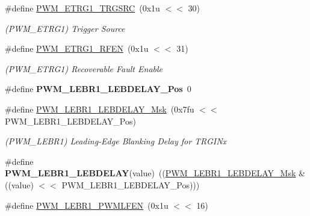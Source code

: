 \begin{DoxyCompactItemize}
\#define \mbox{\hyperlink{group__SAME70__PWM_ga616ec21bb9207fdb750346ff7c510f20}{P\+W\+M\+\_\+\+E\+T\+R\+G1\+\_\+\+T\+R\+G\+S\+RC}}~(0x1u $<$$<$ 30)
\begin{DoxyCompactList}\small\item\em (P\+W\+M\+\_\+\+E\+T\+R\+G1) Trigger Source \end{DoxyCompactList}\item 
\mbox{\label{group__SAME70__PWM_gaf62f0bc7d9db8450ab1c1ecde517d9a2}} 
\#define \mbox{\hyperlink{group__SAME70__PWM_gaf62f0bc7d9db8450ab1c1ecde517d9a2}{P\+W\+M\+\_\+\+E\+T\+R\+G1\+\_\+\+R\+F\+EN}}~(0x1u $<$$<$ 31)
\begin{DoxyCompactList}\small\item\em (P\+W\+M\+\_\+\+E\+T\+R\+G1) Recoverable Fault Enable \end{DoxyCompactList}\item 
\mbox{\label{group__SAME70__PWM_ga5973634d62b8e525c44969baf1841f96}} 
\#define {\bfseries P\+W\+M\+\_\+\+L\+E\+B\+R1\+\_\+\+L\+E\+B\+D\+E\+L\+A\+Y\+\_\+\+Pos}~0
\item 
\mbox{\label{group__SAME70__PWM_ga80e118631de809b0488bbfbcc5c1ade2}} 
\#define \mbox{\hyperlink{group__SAME70__PWM_ga80e118631de809b0488bbfbcc5c1ade2}{P\+W\+M\+\_\+\+L\+E\+B\+R1\+\_\+\+L\+E\+B\+D\+E\+L\+A\+Y\+\_\+\+Msk}}~(0x7fu $<$$<$ P\+W\+M\+\_\+\+L\+E\+B\+R1\+\_\+\+L\+E\+B\+D\+E\+L\+A\+Y\+\_\+\+Pos)
\begin{DoxyCompactList}\small\item\em (P\+W\+M\+\_\+\+L\+E\+B\+R1) Leading-\/\+Edge Blanking Delay for T\+R\+G\+I\+Nx \end{DoxyCompactList}\item 
\mbox{\label{group__SAME70__PWM_ga891308bf34bdc2cf6054a01820a4e32e}} 
\#define {\bfseries P\+W\+M\+\_\+\+L\+E\+B\+R1\+\_\+\+L\+E\+B\+D\+E\+L\+AY}(value)~((\mbox{\hyperlink{group__SAMV71__PWM_ga80e118631de809b0488bbfbcc5c1ade2}{P\+W\+M\+\_\+\+L\+E\+B\+R1\+\_\+\+L\+E\+B\+D\+E\+L\+A\+Y\+\_\+\+Msk}} \& ((value) $<$$<$ P\+W\+M\+\_\+\+L\+E\+B\+R1\+\_\+\+L\+E\+B\+D\+E\+L\+A\+Y\+\_\+\+Pos)))
\item 
\mbox{\label{group__SAME70__PWM_ga0c148eb9b70c985a577669a6115a7731}} 
\#define \mbox{\hyperlink{group__SAME70__PWM_ga0c148eb9b70c985a577669a6115a7731}{P\+W\+M\+\_\+\+L\+E\+B\+R1\+\_\+\+P\+W\+M\+L\+F\+EN}}~(0x1u $<$$<$ 16)
$$
\end{DoxyCompactItemize}
